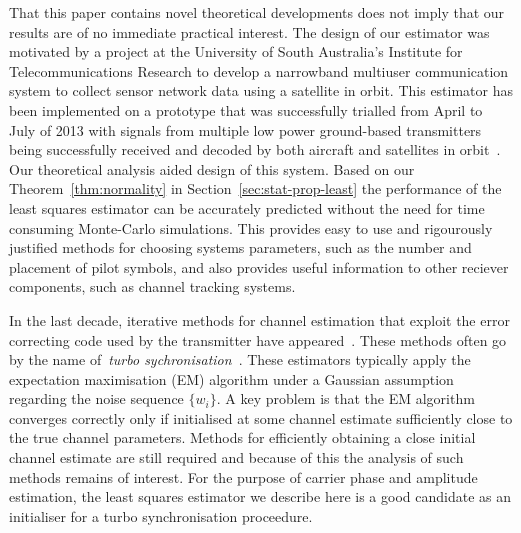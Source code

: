 \documentclass[journal]{IEEEtran}
\begin{document}
That this paper contains novel theoretical developments does not imply that our results are of no immediate practical interest.  The design of our estimator was motivated by a project at the University of South Australia's Institute for Telecommunications Research to develop a narrowband multiuser communication system to collect sensor network data using a satellite in orbit.  This estimator has been implemented on a prototype that was successfully trialled from April to July of 2013 with signals from multiple low power ground-based transmitters being successfully received and decoded by both aircraft and satellites in orbit~\cite{ASRPpromovideo}.  Our theoretical analysis aided design of this system.  Based on our Theorem~\ref{thm:normality} in Section~\ref{sec:stat-prop-least} the performance of the least squares estimator can be accurately predicted without the need for time consuming Monte-Carlo simulations.  This provides easy to use and rigourously justified methods for choosing systems parameters, such as the number and placement of pilot symbols, and also provides useful information to other reciever components, such as channel tracking systems.

In the last decade, iterative methods for channel estimation that exploit the error correcting code used by the transmitter have appeared~\cite{Lottici2004,Noels2005,Herzet_turbo_synch_proc_IEEE_2007,Herzet_timingturbosynch_2007,Herzet_framework_turbo_sync_2007}.  These methods often go by the name of~\emph{turbo sychronisation}~\cite{Herzet_turbo_synch_proc_IEEE_2007}.  
These estimators typically apply the expectation maximisation (EM) algorithm under a Gaussian assumption regarding the noise sequence $\{w_i\}$.  A key problem is that the EM algorithm converges correctly only if initialised at some channel estimate sufficiently close to the true channel parameters.  Methods for efficiently obtaining a close initial channel estimate are still required and because of this the analysis of such methods remains of interest.  For the purpose of carrier phase and amplitude estimation, the least squares estimator we describe here is a good candidate as an initialiser for a turbo synchronisation proceedure.  %
\end{document}
